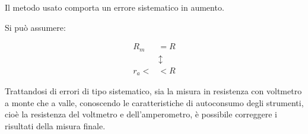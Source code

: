 Il metodo usato comporta un errore sistematico in aumento. \newline 

Si può assumere: 

{
    \Large 
    \begin{equation}
        \begin{split}
            R_m &= R 
            \\
            &\updownarrow
            \\
            r_a <&< R
        \end{split}
    \end{equation}
}

Trattandosi di errori di tipo sistematico, sia la misura in resistenza con voltmetro a monte che a valle, conoscendo le caratteristiche di autoconsumo 
degli strumenti, cioè la resistenza del voltmetro e dell'amperometro, 
è possibile correggere i risultati della misura finale. \newline 


\newpage 


